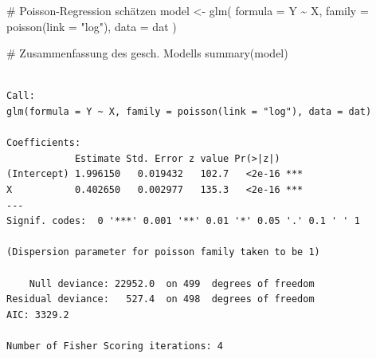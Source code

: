 \documentclass[
  a4paper,
  DIV=11,
  oneside]{scrreprt}
\newenvironment{Shaded}{\begin{snugshade}}{\end{snugshade}}
\newcommand{\AttributeTok}[1]{\textcolor[rgb]{0.40,0.45,0.13}{#1}}
\newcommand{\CommentTok}[1]{\textcolor[rgb]{0.37,0.37,0.37}{#1}}
\newcommand{\FunctionTok}[1]{\textcolor[rgb]{0.28,0.35,0.67}{#1}}
\newcommand{\NormalTok}[1]{\textcolor[rgb]{0.00,0.23,0.31}{#1}}
\newcommand{\OtherTok}[1]{\textcolor[rgb]{0.00,0.23,0.31}{#1}}
\newcommand{\SpecialCharTok}[1]{\textcolor[rgb]{0.37,0.37,0.37}{#1}}
\newcommand{\StringTok}[1]{\textcolor[rgb]{0.13,0.47,0.30}{#1}}
\begin{document}
\begin{Shaded}
\begin{Highlighting}[]
\CommentTok{\# Poisson{-}Regression schätzen}
\NormalTok{model }\OtherTok{\textless{}{-}} \FunctionTok{glm}\NormalTok{(}
  \AttributeTok{formula =}\NormalTok{ Y }\SpecialCharTok{\textasciitilde{}}\NormalTok{ X, }
  \AttributeTok{family =} \FunctionTok{poisson}\NormalTok{(}\AttributeTok{link =} \StringTok{"log"}\NormalTok{), }
  \AttributeTok{data =}\NormalTok{ dat}
\NormalTok{)}

\CommentTok{\# Zusammenfassung des gesch. Modells}
\FunctionTok{summary}\NormalTok{(model)}
\end{Highlighting}
\end{Shaded}

\begin{verbatim}

Call:
glm(formula = Y ~ X, family = poisson(link = "log"), data = dat)

Coefficients:
            Estimate Std. Error z value Pr(>|z|)    
(Intercept) 1.996150   0.019432   102.7   <2e-16 ***
X           0.402650   0.002977   135.3   <2e-16 ***
---
Signif. codes:  0 '***' 0.001 '**' 0.01 '*' 0.05 '.' 0.1 ' ' 1

(Dispersion parameter for poisson family taken to be 1)

    Null deviance: 22952.0  on 499  degrees of freedom
Residual deviance:   527.4  on 498  degrees of freedom
AIC: 3329.2

Number of Fisher Scoring iterations: 4
\end{verbatim}
\end{document}
